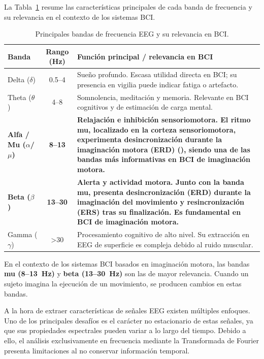 La Tabla~\ref{tab:bandasEEG} resume las características principales de cada banda de frecuencia y su relevancia en el contexto de los sistemas BCI.

\begin{table}[h]
\centering
\caption{Principales bandas de frecuencia EEG y su relevancia en BCI.}
\label{tab:bandasEEG}
\begin{tabular}{|l|c|p{7.5cm}|}
\hline
\textbf{Banda} & \textbf{Rango (Hz)} & \textbf{Función principal / relevancia en BCI} \\
\hline
Delta ($\delta$) & 0.5–4   & Sueño profundo. Escasa utilidad directa en BCI; su presencia en vigilia puede indicar fatiga o artefacto. \\
\hline
Theta ($\theta$) & 4–8     & Somnolencia, meditación y memoria. Relevante en BCI cognitivos y de estimación de carga mental. \\
\hline
\textbf{Alfa / Mu ($\alpha$/$\mu$)} & \textbf{8–13} & \textbf{Relajación e inhibición sensoriomotora. El ritmo mu, localizado en la corteza sensoriomotora, experimenta desincronización durante la imaginación motora (ERD) (\cite{pfurtscheller1999event}), siendo una de las bandas más informativas en BCI de imaginación motora.} \\
\hline
\textbf{Beta ($\beta$)} & \textbf{13–30} & \textbf{Alerta y actividad motora. Junto con la banda mu, presenta desincronización (ERD) durante la imaginación del movimiento y resincronización (ERS) tras su finalización. Es fundamental en BCI de imaginación motora.} \\
\hline
Gamma ($\gamma$) & >30     & Procesamiento cognitivo de alto nivel. Su extracción en EEG de superficie es compleja debido al ruido muscular. \\
\hline
\end{tabular}
\end{table}

En el contexto de los sistemas BCI basados en imaginación motora, las bandas \textbf{mu (8–13~Hz)} y \textbf{beta (13–30~Hz)} son las de mayor relevancia. Cuando un sujeto imagina la ejecución de un movimiento, se producen cambios en estas bandas.

A la hora de extraer características de señales EEG existen múltiples enfoques. Uno de los principales desafíos es el carácter no estacionario de estas señales, ya que sus propiedades espectrales pueden variar a lo largo del tiempo. Debido a ello, el análisis exclusivamente en frecuencia mediante la Transformada de Fourier presenta limitaciones al no conservar información temporal.

